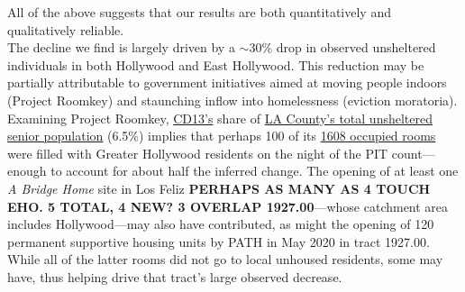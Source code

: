 \documentclass[11pt]{article}
\def\bfr{\bf\color{red}}
\begin{document}
%
%
%



All of the above suggests that our results are both quantitatively and qualitatively reliable.\\

 The decline we find is largely driven by a $\sim$30\% drop in observed 
unsheltered individuals in both Hollywood and East Hollywood. This reduction may be partially attributable to 
government initiatives aimed at moving people indoors (Project Roomkey) and staunching inflow into homelessness 
(eviction moratoria). Examining Project Roomkey, \href{https://www.lahsa.org/documents?id=4672-2020-homeless-count-council-district-13}
{CD13's} share of \href{https://www.lahsa.org/documents?id=4585-2020-greater-los-angeles-homeless-count-los-angeles-continuum-of-care-coc-}{LA County's total unsheltered senior population} (6.5\%) implies that perhaps 100 of its 
\href{https://projectroomkeytracker.com/}{1608 occupied rooms} were filled with Greater Hollywood 
residents on the night of the PIT count---enough to account for about half the inferred change. 
The opening of at least one {\it A Bridge Home} site in Los Feliz {\bfr PERHAPS AS MANY AS 4 TOUCH EHO. 
5 TOTAL, 4 NEW? 3 OVERLAP 1927.00}---whose 
catchment area includes Hollywood---may 
also have contributed, as might the opening of 120 permanent supportive housing units by PATH in May 2020 
in tract 1927.00. While all of the latter rooms did not go to local unhoused residents, some may have, thus 
helping drive that tract's large observed decrease. 
\end{document}
